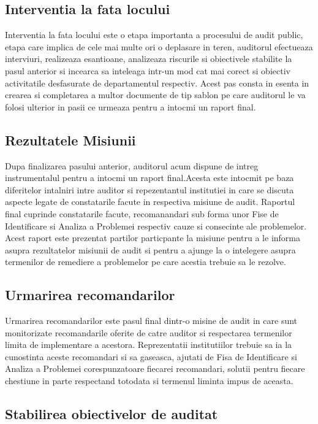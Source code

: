 \subsection*{Interventia la fata locului}
Interventia la fata locului este o etapa importanta a procesului de audit public, etapa care implica de cele mai multe ori o deplasare in teren, auditorul efectueaza interviuri, realizeaza esantioane, analizeaza riscurile si obiectivele stabilite la pasul anterior si incearca sa inteleaga intr-un mod cat mai corect si obiectiv activitatile desfasurate de departamentul respectiv. Acest pas consta in esenta in crearea si completarea a multor documente de tip sablon pe care auditorul le va folosi ulterior in pasii ce urmeaza pentru a intocmi un raport final.

\subsection*{Rezultatele Misiunii}
Dupa finalizarea pasului anterior, auditorul acum dispune de intreg instrumentalul pentru a intocmi un raport final.Acesta este intocmit pe baza diferitelor intalniri intre auditor si repezentantul institutiei in care se discuta aspecte legate de constatarile facute in respectiva misiune de audit. Raportul final cuprinde constatarile facute, recomanandari sub forma 
unor Fise de Identificare si Analiza a Problemei respectiv cauze si consecinte ale problemelor.\\
Acest raport este prezentat partilor particpante la misiune pentru a le informa asupra rezultatelor misiunii de audit si pentru a ajunge la o intelegere asupra termenilor de remediere a problemelor pe care acestia trebuie sa le rezolve.

\subsection*{Urmarirea recomandarilor}
Urmarirea recomandarilor este pasul final dintr-o misine de audit in care sunt monitorizate recomandarile oferite de catre auditor si respectarea termenilor limita de implementare a acestora. Reprezentatii institutiilor trebuie sa ia la cunostinta aceste recomandari si sa gaseasca, ajutati de Fisa de Identificare si Analiza a Problemei corespunzatoare fiecarei recomandari, solutii pentru fiecare chestiune in parte respectand totodata si termenul liminta impus de aceasta.


\subsection{Stabilirea obiectivelor de auditat}

